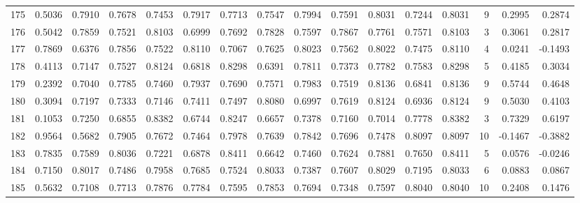 \begin{tabular}{lrrrrrrrrrrrrrrr}
175 &      0.5036 &  0.7910 &  0.7678 &  0.7453 &  0.7917 &  0.7713 &  0.7547 &  0.7994 &  0.7591 &  0.8031 &   0.7244 &     0.8031 &      9 &                    0.2995 &                     0.2874 \\
176 &      0.5042 &  0.7859 &  0.7521 &  0.8103 &  0.6999 &  0.7692 &  0.7828 &  0.7597 &  0.7867 &  0.7761 &   0.7571 &     0.8103 &      3 &                    0.3061 &                     0.2817 \\
177 &      0.7869 &  0.6376 &  0.7856 &  0.7522 &  0.8110 &  0.7067 &  0.7625 &  0.8023 &  0.7562 &  0.8022 &   0.7475 &     0.8110 &      4 &                    0.0241 &                    -0.1493 \\
178 &      0.4113 &  0.7147 &  0.7527 &  0.8124 &  0.6818 &  0.8298 &  0.6391 &  0.7811 &  0.7373 &  0.7782 &   0.7583 &     0.8298 &      5 &                    0.4185 &                     0.3034 \\
179 &      0.2392 &  0.7040 &  0.7785 &  0.7460 &  0.7937 &  0.7690 &  0.7571 &  0.7983 &  0.7519 &  0.8136 &   0.6841 &     0.8136 &      9 &                    0.5744 &                     0.4648 \\
180 &      0.3094 &  0.7197 &  0.7333 &  0.7146 &  0.7411 &  0.7497 &  0.8080 &  0.6997 &  0.7619 &  0.8124 &   0.6936 &     0.8124 &      9 &                    0.5030 &                     0.4103 \\
181 &      0.1053 &  0.7250 &  0.6855 &  0.8382 &  0.6744 &  0.8247 &  0.6657 &  0.7378 &  0.7160 &  0.7014 &   0.7778 &     0.8382 &      3 &                    0.7329 &                     0.6197 \\
182 &      0.9564 &  0.5682 &  0.7905 &  0.7672 &  0.7464 &  0.7978 &  0.7639 &  0.7842 &  0.7696 &  0.7478 &   0.8097 &     0.8097 &     10 &                   -0.1467 &                    -0.3882 \\
183 &      0.7835 &  0.7589 &  0.8036 &  0.7221 &  0.6878 &  0.8411 &  0.6642 &  0.7460 &  0.7624 &  0.7881 &   0.7650 &     0.8411 &      5 &                    0.0576 &                    -0.0246 \\
184 &      0.7150 &  0.8017 &  0.7486 &  0.7958 &  0.7685 &  0.7524 &  0.8033 &  0.7387 &  0.7607 &  0.8029 &   0.7195 &     0.8033 &      6 &                    0.0883 &                     0.0867 \\
185 &      0.5632 &  0.7108 &  0.7713 &  0.7876 &  0.7784 &  0.7595 &  0.7853 &  0.7694 &  0.7348 &  0.7597 &   0.8040 &     0.8040 &     10 &                    0.2408 &                     0.1476 \\

\end{tabular}
